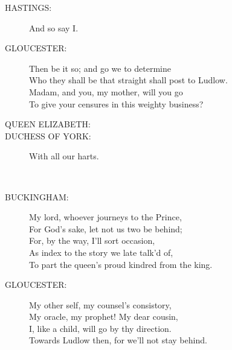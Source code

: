 \documentclass{article}
\begin{document}
\begin{description}
\item[HASTINGS:] 
\hspace{1pt}And so say I.\\
\end{description}
\begin{description}
\item[GLOUCESTER:] 
\hspace{1pt}Then be it so; and go we to determine\\
\hspace{1pt}Who they shall be that straight shall post to Ludlow.\\
\hspace{1pt}Madam, and you, my mother, will you go\\
\hspace{1pt}To give your censures in this weighty business?\\
\end{description}
\begin{description}
\item[QUEEN ELIZABETH:] 
\item[DUCHESS OF YORK:] 
\hspace{1pt}With all our harts.\\
\end{description}
\\
\begin{description}
\item[BUCKINGHAM:] 
\hspace{1pt}My lord, whoever journeys to the Prince,\\
\hspace{1pt}For God's sake, let not us two be behind;\\
\hspace{1pt}For, by the way, I'll sort occasion,\\
\hspace{1pt}As index to the story we late talk'd of,\\
\hspace{1pt}To part the queen's proud kindred from the king.\\
\end{description}
\begin{description}
\item[GLOUCESTER:] 
\hspace{1pt}My other self, my counsel's consistory,\\
\hspace{1pt}My oracle, my prophet! My dear cousin,\\
\hspace{1pt}I, like a child, will go by thy direction.\\
\hspace{1pt}Towards Ludlow then, for we'll not stay behind.\\
\end{description}
\centering{\it [Exeunt]}\\
\end{document}

